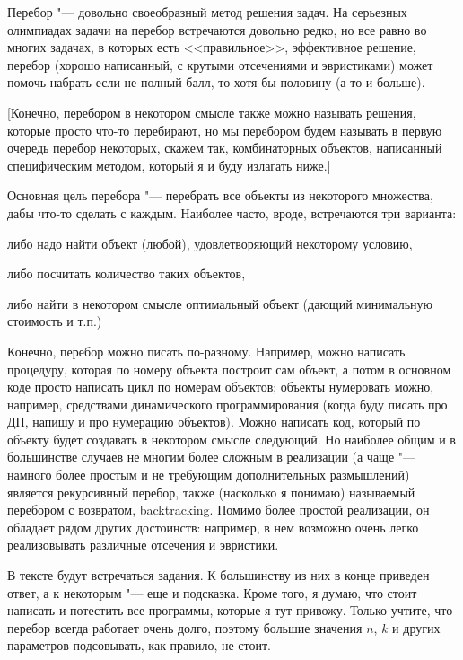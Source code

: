 

Перебор "--- довольно своеобразный метод решения задач. На серьезных олимпиадах 
задачи на перебор встречаются довольно редко, но все равно во многих задачах, в 
которых есть <<правильное>>, эффективное решение, перебор (хорошо написанный, с 
крутыми отсечениями и эвристиками) может помочь набрать если не полный балл, то 
хотя бы половину (а то и больше).

[Конечно, перебором в некотором смысле также можно называть решения, которые 
просто что-то перебирают, но мы перебором будем называть в первую очередь перебор 
некоторых, скажем так, комбинаторных объектов, написанный специфическим методом, который я и буду
излагать ниже.]

Основная цель перебора "--- перебрать все объекты из некоторого множества, дабы 
что-то сделать с каждым. Наиболее 
часто, вроде, встречаются три варианта:
\begin{ulist}
\item либо надо найти объект (любой), удовлетворяющий некоторому условию,
\item либо посчитать количество таких объектов,
\item либо найти в некотором смысле оптимальный объект (дающий минимальную 
   стоимость и т.п.)
\end{ulist}

Конечно, перебор можно писать по-разному. Например, можно написать процедуру, которая по номеру объекта построит сам объект, а потом в основном коде просто написать цикл по номерам объектов; объекты нумеровать можно, например, средствами динамического программирования (когда буду писать про ДП, напишу и про нумерацию объектов). Можно написать код, который по 
объекту будет создавать в некотором смысле следующий. Но наиболее
общим и в большинстве случаев не многим более сложным в реализации (а чаще "--- намного более простым и не требующим дополнительных размышлений) является
рекурсивный перебор, также (насколько я понимаю) называемый перебором с
возвратом, backtracking. Помимо более простой реализации, он обладает рядом других достоинств: например, в нем возможно очень легко реализовывать различные отсечения и эвристики.

В тексте будут встречаться задания. К большинству из них в конце приведен ответ, а к некоторым "--- еще и подсказка. Кроме того, я думаю, что стоит написать и потестить все программы, которые я тут привожу. Только учтите, что перебор всегда работает очень долго, поэтому большие значения $n$, $k$ и других параметров подсовывать, как правило, не стоит.







